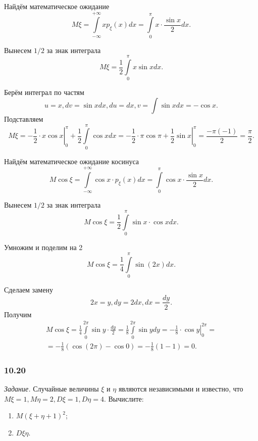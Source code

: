 Найдём математическое ожидание
$$M \xi =
\int \limits_{- \infty }^{+ \infty } xp_{ \xi } \left( x \right) dx =
\int \limits_0^{ \pi } x \cdot \frac{ \sin x}{2} dx.$$

Вынесем $1/2$ за знак интеграла
$$M \xi =
\frac{1}{2} \int \limits_0^{ \pi } x \sin x dx.$$

Берём интеграл по частям
$$u = x,
dv = \sin x dx,
du = dx,
v = \int \sin x dx = - \cos x.$$
Подставляем
$$M \xi =
\left. - \frac{1}{2} \cdot x \cos x \right|_0^{ \pi } + \frac{1}{2} \int \limits_0^{ \pi } \cos x dx =
\left. - \frac{1}{2} \cdot \pi \cos \pi + \frac{1}{2} \sin x \right|_0^{ \pi } =
\frac{- \pi \left( -1 \right) }{2} =
\frac{ \pi }{2}.$$

Найдём математическое ожидание косинуса
$$M \cos \xi =
\int \limits_{- \infty }^{+ \infty } \cos x \cdot p_{ \xi } \left( x \right) dx =
\int \limits_0^{ \pi } \cos x \cdot \frac{ \sin x}{2} dx.$$

Вынесем $1/2$ за знак интеграла
$$M \cos \xi =
\frac{1}{2} \int \limits_0^{ \pi } \sin x \cdot \cos x dx.$$

Умножим и поделим на 2
$$M \cos \xi =
\frac{1}{4} \int \limits_0^{ \pi } \sin \left( 2x \right) dx.$$

Сделаем замену
$$2x = y,
dy = 2dx,
dx = \frac{dy}{2}.$$
Получим
\begin{equation*}
\begin{split}
M \cos \xi =
\frac{1}{4} \int \limits_0^{2 \pi } \sin y \cdot \frac{dy}{2} =
\frac{1}{8} \int \limits_0^{2 \pi } \sin y dy =
\left. - \frac{1}{8} \cdot \cos y \right|_0^{2 \pi} = \\
= - \frac{1}{8} \left( \cos \left( 2 \pi \right) - \cos 0 \right) =
- \frac{1}{8} \left( 1 - 1 \right) =
0.
\end{split}
\end{equation*}

\subsubsection*{10.20}

\textit{Задание.} Случайные величины $ \xi $ и $ \eta $ являются независимыми и известно, что $M \xi = 1, M \eta = 2, D \xi = 1, D \eta = 4$.
Вычислите:
\begin{enumerate}[label=\alph*)]
\item $M \left( \xi + \eta + 1 \right)^2$;
\item $D \xi \eta $.
\end{enumerate}

